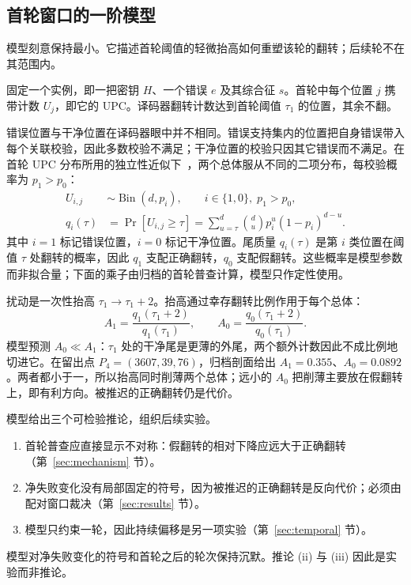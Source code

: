\subsection{首轮窗口的一阶模型}\label{sec:model}

模型刻意保持最小。它描述首轮阈值的轻微抬高如何重塑该轮的翻转；后续轮不在其范围内。

固定一个实例，即一把密钥 $H$、一个错误 $e$ 及其综合征 $s$。首轮中每个位置 $j$ 携带计数 $U_j$，即它的 UPC。译码器翻转计数达到首轮阈值 $\tau_1$ 的位置，其余不翻。

错误位置与干净位置在译码器眼中并不相同。错误支持集内的位置把自身错误带入每个关联校验，因此多数校验不满足；干净位置的校验只因其它错误而不满足。在首轮 UPC 分布所用的独立性近似下~\cite{annechini2024estimation}，两个总体服从不同的二项分布，每校验概率为 $p_1>p_0$：
\begin{equation}\label{eq:upc-tails}
\begin{aligned}
U_{i,j} &\sim \operatorname{Bin}(d,p_i), \qquad i\in\{1,0\},\; p_1>p_0,\\
q_i(\tau) &= \Pr[U_{i,j}\ge\tau]
= \textstyle\sum_{u=\tau}^{d}\binom{d}{u}p_i^{u}(1-p_i)^{d-u}.
\end{aligned}
\end{equation}
其中 $i=1$ 标记错误位置，$i=0$ 标记干净位置。尾质量 $q_i(\tau)$ 是第 $i$ 类位置在阈值 $\tau$ 处翻转的概率，因此 $q_1$ 支配正确翻转，$q_0$ 支配假翻转。这些概率是模型参数而非拟合量；下面的乘子由归档的首轮普查计算，模型只作定性使用。

扰动是一次性抬高 $\tau_1\to\tau_1+2$。抬高通过幸存翻转比例作用于每个总体：
\begin{equation}\label{eq:multipliers}
A_1=\frac{q_1(\tau_1+2)}{q_1(\tau_1)},\qquad
A_0=\frac{q_0(\tau_1+2)}{q_0(\tau_1)} .
\end{equation}
模型预测 $A_0\ll A_1$：$\tau_1$ 处的干净尾是更薄的外尾，两个额外计数因此不成比例地切进它。在留出点 $P_4=(3607,39,76)$，归档剖面给出 $A_1 = 0.355$、$A_0 = 0.0892$。两者都小于一，所以抬高同时削薄两个总体；远小的 $A_0$ 把削薄主要放在假翻转上，即有利方向。被推迟的正确翻转仍是代价。

模型给出三个可检验推论，组织后续实验。
\begin{enumerate}[label=(\roman*),leftmargin=*,itemsep=1pt,topsep=2pt]
\item 首轮普查应直接显示不对称：假翻转的相对下降应远大于正确翻转（第~\ref{sec:mechanism} 节）。
\item 净失败变化没有局部固定的符号，因为被推迟的正确翻转是反向代价；必须由配对窗口裁决（第~\ref{sec:results} 节）。
\item 模型只约束一轮，因此持续偏移是另一项实验（第~\ref{sec:temporal} 节）。
\end{enumerate}
模型对净失败变化的符号和首轮之后的轮次保持沉默。推论 (ii) 与 (iii) 因此是实验而非推论。
